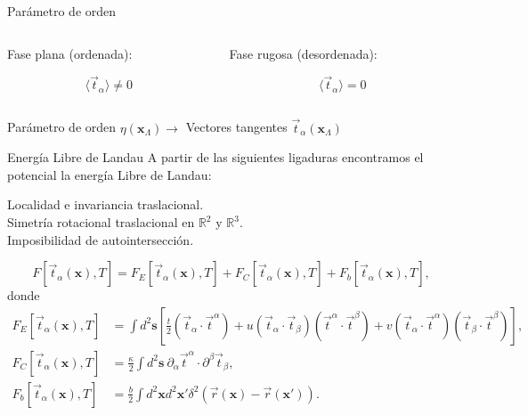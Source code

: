 \documentclass[xcolor=dvipsnames]{beamer}
\begin{document}
\begin{frame}{Parámetro de orden}
\centering
\begin{columns}[T]
    \begin{column}{5.8cm}
      Fase plana (ordenada):
        \centering
        \begin{figure}[h]
        \resizebox{\columnwidth}{!}{}
        \end{figure}
        $$ \langle\vec{t}_{\alpha}\rangle\neq 0$$
    \end{column}
    
    \hspace{0.5cm}
    
    \begin{column}{5.8cm}
      Fase rugosa (desordenada):
        \centering
        \begin{figure}[h]
        \resizebox{\columnwidth}{!}{}
        \end{figure}
        $$ \langle\vec{t}_{\alpha}\rangle= 0$$
    \end{column}
  \end{columns}
\vspace{0.8cm}

Parámetro de orden $\eta(\mathbf{x}_{\Lambda})\longrightarrow$ Vectores tangentes $\vec{t}_{\alpha}(\mathbf{x}_{\Lambda})$ 
\end{frame}
\begin{frame}{Energía Libre de Landau}
A partir de las siguientes ligaduras encontramos el potencial la energía Libre
de Landau:
  \begin{description}
  \item[Localidad e invariancia traslacional.]
  \item[Simetría rotacional traslacional en $\mathbb{R}^2$ y $\mathbb{R}^3$.]
  \item[Imposibilidad de autointersección.]
  \end{description}

  \begin{equation*}
    F[\vec{t}_{\alpha}(\mathbf{x}),T]=F_E[\vec{t}_{\alpha}(\mathbf{x}),T]+F_C[\vec{t}_{\alpha}(\mathbf{x}),T]+F_b[\vec{t}_{\alpha}(\mathbf{x}),T],
  \end{equation*}
  donde
  \begin{align*}
    F_E[\vec{t}_{\alpha}(\mathbf{x}),T]&=\int d^2\mathbf{s}\left[
      \frac{t}{2}\!(\vec{t}_{\alpha}\!\cdot\!\vec{t}^{\alpha})+
      u(\vec{t}_{\alpha}\!\cdot\!\vec{t}_{\beta})(\vec{t}^{\alpha}\!\cdot\!\vec{t}^{\beta})+
      v(\vec{t}_{\alpha}\!\cdot\!\vec{t}^{\alpha})(\vec{t}_{\beta}\!\cdot\!\vec{t}^{\beta})\right],\\
    F_C[\vec{t}_{\alpha}(\mathbf{x}),T]&= \frac{\kappa}{2}\int d^2\mathbf{s}\
     \partial_{\alpha}\vec{t}^{\alpha}\cdot\partial^{\beta}\vec{t}_{\beta},\\ 
   F_b[\vec{t}_{\alpha}(\mathbf{x}),T]&=\frac{b}{2}\int d^2\mathbf{x} d^2\mathbf{x'}
\delta^2(\vec{r}(\mathbf{x})-\vec{r}(\mathbf{x'})).
  \end{align*}
\end{frame}
\end{document}
